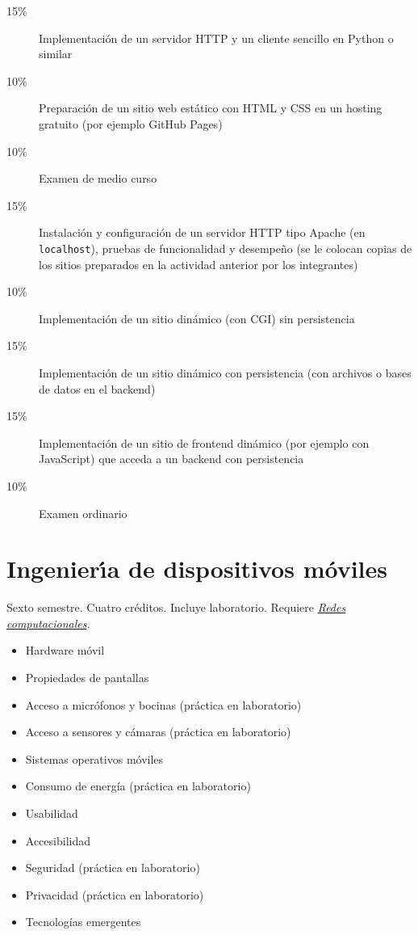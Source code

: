 \documentclass{article}
\begin{document}
\begin{multicols}{4}
\begin{description}
\item[15\%]{Implementaci\'{o}n de un servidor HTTP y un cliente sencillo
  en Python o similar}
\item[10\%]{Preparaci\'{o}n de un sitio web est\'{a}tico con HTML y CSS en un
  hosting gratuito (por ejemplo GitHub Pages)}
\item[10\%]{Examen de medio curso}  
\item[15\%]{Instalaci\'{o}n y configuraci\'{o}n de un
  servidor HTTP tipo Apache (en \texttt{localhost}), pruebas de
  funcionalidad y desempe\~{n}o (se le colocan copias de los sitios
  preparados en la actividad anterior por los integrantes)}
\item[10\%]{Implementaci\'{o}n de un sitio din\'{a}mico (con CGI) sin
  persistencia}
\item[15\%]{Implementaci\'{o}n de un sitio din\'{a}mico con
  persistencia (con archivos o bases de datos en el backend)}
\item[15\%]{Implementaci\'{o}n de un sitio de frontend din\'{a}mico (por
  ejemplo con JavaScript) que acceda a un backend con persistencia}
\item[10\%]{Examen ordinario}
\end{description}  
\vfill\null \columnbreak

\hypertarget{iddm}{\section*{Ingenier\'{\i}a de dispositivos m\'{o}viles}} 

Sexto semestre. Cuatro cr\'{e}ditos. Incluye laboratorio. Requiere
\hyperlink{rc}{\em Redes computacionales}.

\begin{itemize}
\item{Hardware m\'{o}vil}
\item{Propiedades de pantallas}  
\item{Acceso a micr\'{o}fonos y bocinas (pr\'{a}ctica en laboratorio)}  
\item{Acceso a sensores y c\'{a}maras (pr\'{a}ctica en laboratorio)}      
\item{Sistemas operativos m\'{o}viles}
\item{Consumo de energ\'{i}a (pr\'{a}ctica en laboratorio)}  
\item{Usabilidad}
\item{Accesibilidad}
\item{Seguridad (pr\'{a}ctica en laboratorio)}  
\item{Privacidad (pr\'{a}ctica en laboratorio)}  
\item{Tecnolog\'{i}as emergentes}
\end{itemize}


\end{multicols}
\end{document}
